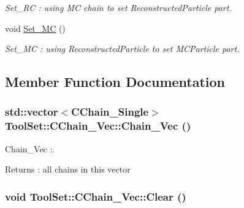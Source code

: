 \begin{DoxyCompactItemize}
\begin{DoxyCompactList}\small\item\em Set\_\-RC : using MC chain to set ReconstructedParticle part. \item\end{DoxyCompactList}\item 
\hypertarget{classToolSet_1_1CChain__Vec_ab706092b55510c69a2154b2a69c78e55}{
void \hyperlink{classToolSet_1_1CChain__Vec_ab706092b55510c69a2154b2a69c78e55}{Set\_\-MC} ()}
\label{classToolSet_1_1CChain__Vec_ab706092b55510c69a2154b2a69c78e55}

\begin{DoxyCompactList}\small\item\em Set\_\-MC : using ReconstructedParticle to set MCParticle part. \item\end{DoxyCompactList}\end{DoxyCompactItemize}


\subsection{Member Function Documentation}
\hypertarget{classToolSet_1_1CChain__Vec_ace17e3ec32dca382602d0ccc9f2d377e}{
\subsubsection[{Chain\_\-Vec}]{\setlength{\rightskip}{0pt plus 5cm}std::vector$<${\bf CChain\_\-Single}$>$ ToolSet::CChain\_\-Vec::Chain\_\-Vec ()}}
\label{classToolSet_1_1CChain__Vec_ace17e3ec32dca382602d0ccc9f2d377e}


Chain\_\-Vec :. \begin{DoxyReturn}{Returns}
: all chains in this vector 
\end{DoxyReturn}
\hypertarget{classToolSet_1_1CChain__Vec_a3068461a3bd0fe085f522e6bb2d24f07}{
\subsubsection[{Clear}]{\setlength{\rightskip}{0pt plus 5cm}void ToolSet::CChain\_\-Vec::Clear ()}}
\label{classToolSet_1_1CChain__Vec_a3068461a3bd0fe085f522e6bb2d24f07}



